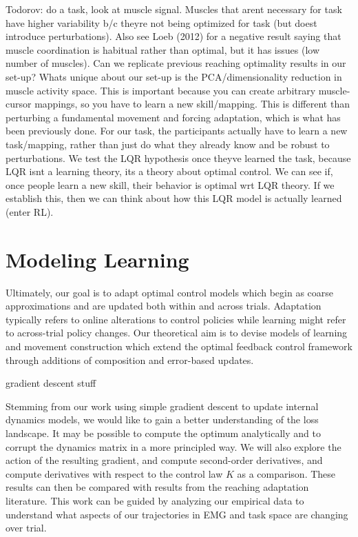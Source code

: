 \documentclass[../main.tex]{subfiles}
\begin{document}
 Todorov: do a task, look at muscle signal. Muscles that arent necessary for task have higher variability b/c theyre not being optimized for task (but doest introduce perturbations). Also see Loeb (2012) for a negative result saying that muscle coordination is habitual rather than optimal, but it has issues (low number of muscles). Can we replicate previous reaching optimality results in our set-up? Whats unique about our set-up is the PCA/dimensionality reduction in muscle activity space. This is important because you can create arbitrary muscle-cursor mappings, so you have to learn a new skill/mapping. This is different than perturbing a fundamental movement and forcing adaptation, which is what has been previously done. For our task, the participants actually have to learn a new task/mapping, rather than just do what they already know and be robust to perturbations. We test the LQR hypothesis once theyve learned the task, because LQR isnt a learning theory, its a theory about optimal control. We can see if, once people learn a new skill, their behavior is optimal wrt LQR theory. If we establish this, then we can think about how this LQR model is actually learned (enter RL). 

\section{Modeling Learning}

Ultimately, our goal is to adapt optimal control models which begin as coarse approximations and are updated both within and across trials. Adaptation typically refers to online alterations to control policies while learning might refer to across-trial policy changes. Our theoretical aim is to devise models of learning and movement construction which extend the optimal feedback control framework through additions of composition and error-based updates.

 gradient descent stuff 

Stemming from our work using simple gradient descent to update internal dynamics models, we would like to gain a better understanding of the loss landscape. It may be possible to compute the optimum analytically and to corrupt the dynamics matrix in a more principled way. We will also explore the action of the resulting gradient, and compute second-order derivatives, and compute derivatives with respect to the control law $K$ as a comparison. These results can then be compared with results from the reaching adaptation literature. This work can be guided by analyzing our empirical data to understand what aspects of our trajectories in EMG and task space are changing over trial.
\end{document}
